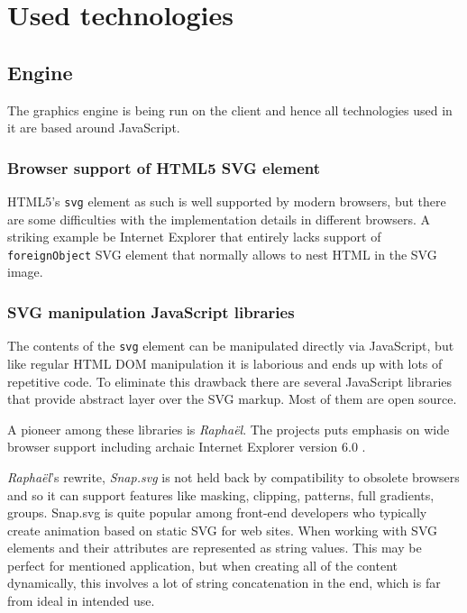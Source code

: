 \documentclass[11pt,oneside, final]{fithesis2}
\begin{document}
\chapter{Used technologies}
\label{tech}

\section{Engine}
The graphics engine is being run on the client and hence all technologies used in it are based around JavaScript.

\subsection{Browser support of HTML5 SVG element}
HTML5's \texttt{svg} element as such is well supported by modern browsers\cite{html5svg}, but there are some difficulties with the implementation details in different browsers. A striking example be Internet Explorer that entirely lacks support of \texttt{foreignObject} SVG element that normally allows to nest HTML in the SVG image\cite{ieforeignobject}.

\subsection{SVG manipulation JavaScript libraries}
The contents of the \texttt{svg} element can be manipulated directly via JavaScript, but like regular HTML DOM manipulation it is laborious and ends up with lots of repetitive code. To eliminate this drawback there are several JavaScript libraries that provide abstract layer over the SVG markup. Most of them are open source.

A pioneer among these libraries is \emph{Raphaël}. The projects puts emphasis on wide browser support including archaic Internet Explorer version 6.0 \cite{raphael}.

\emph{Raphaël}'s rewrite, \emph{Snap.svg} is not held back by compatibility to obsolete browsers and so it can support features like masking, clipping, patterns, full gradients, groups\cite{snap}. Snap.svg is quite popular among front-end developers who typically create animation based on static SVG for web sites\cite{snapusage}. When working with SVG elements and their attributes are represented as string values. This may be perfect for mentioned application, but when creating all of the content dynamically, this involves a lot of string concatenation in the end, which is far from ideal in intended use.
\end{document}
